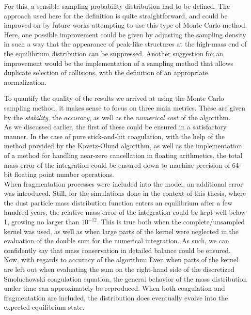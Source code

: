 For this, a sensible sampling probability distribution had to be defined. The approach used here 
for the definition is quite straightforward, and could be improved on by future works attempting 
to use this type of Monte Carlo method. 
Here, one possible improvement could be given by adjusting 
the sampling density in such a way that the appearance of peak-like structures at the high-mass 
end of the equilibrium distribution can be suppressed. Another suggestion for an improvement would 
be the implementation of a sampling method that allows duplicate selection of collisions, with the 
definition of an appropriate normalization.

\clearpage

To quantify the quality of the results we arrived at using the Monte Carlo sampling method, it 
makes sense to 
focus on three main metrics. These are given by the \textit{stability}, the \textit{accuracy}, 
as well as the \textit{numerical cost} of the algorithm. \\

As we discussed earlier, the first of these could be ensured in a satisfactory manner.
In the case of pure stick-and-hit coagulation, with the help of the method provided by the 
Kovetz-Olund algorithm, as well as the implementation of a method for handling near-zero
cancellation in floating arithmetics, the total mass error of the integration 
could be ensured down to machine precision of 64-bit floating point number operations. \\

When fragmentation processes were included into the model, an additional error was introduced.
Still, for the simulations done in the context of this thesis, where the dust 
particle mass distribution function enters an equilibrium after a few hundred years,
the relative mass error of the integration could be kept well below 1, growing no larger 
than $10^{-12}$. 
This is true both when the complete/unsampled kernel was used, as well as when large parts of the 
kernel were neglected in the evaluation of the double sum for the numerical integration. As such,
we can confidently say that mass conservation in detailed balance could be ensured. \\

Now, with regards to accuracy of the algorithm:
Even when parts of the kernel are left out when evaluating the sum on the right-hand side of 
the discretized Smoluchowski coagulation equation, the general behavior of the mass distribution 
under time can approximately be reproduced. When both coagulation and fragmentation are included, 
the distribution does eventually evolve into the expected equilibrium state. \\


